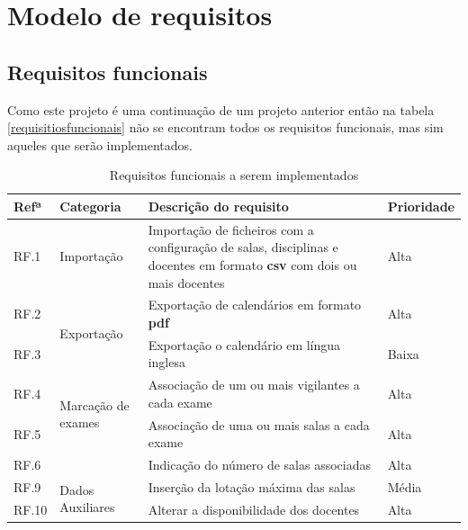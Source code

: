 \documentclass[12pt, twoside]{report}
\begin{document}
	\chapter{Modelo de requisitos}
	\label{requisitos}
	\section{Requisitos funcionais}
	
	Como este projeto é uma continuação de um projeto anterior então na tabela \ref{requisitiosfuncionais} não se encontram todos os requisitos funcionais, mas sim aqueles que serão implementados. 
	
	
\def\arraystretch{1.5}
	\begin{center}
		\label{requisitiosfuncionais}
		\begin{longtable}{|m{1cm}|m{2.2cm}|m{10cm}|m{2cm}|}
			\caption{Requisitos funcionais a serem implementados}\\
			
			\hline			
			\textbf{Refª }	& \textbf{Categoria}&\textbf{Descrição do requisito} & \textbf{Prioridade} \\
			\hline
			
			
			RF.1 &Importação& Importação de ficheiros com a configuração de salas, disciplinas e docentes em formato \textbf{csv} com dois ou mais docentes& Alta \\
			\hline
			
			RF.2 &\multirow{2}{2cm}{Exportação}& Exportação de calendários em formato \textbf{pdf} & Alta \\
			
			RF.3 && Exportação o calendário em língua inglesa & Baixa \\
			\hline
			
			RF.4 &\multirow{2}{2cm}{Marcação de exames}& Associação de um ou mais vigilantes a cada exame & Alta\\
						
			RF.5 &&	Associação de uma ou mais salas a cada exame & Alta\\
			
			RF.6 &&Indicação do número de salas associadas & Alta\\
			\hline
		
			RF.9 &\multirow{6}{2cm}{Dados Auxiliares}& Inserção da lotação máxima das salas& Média \\
			
			RF.10 && Alterar a disponibilidade dos docentes & Alta\\
			

\end{longtable}
\end{center}
\end{document}
